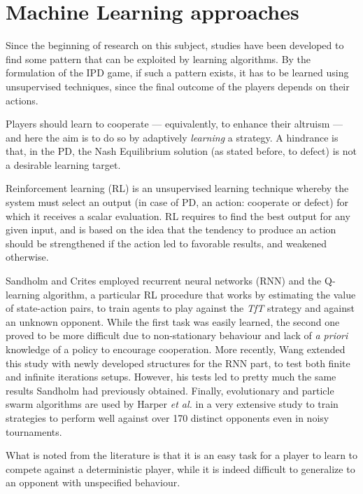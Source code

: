 \documentclass[journal,10pt,twoside]{IEEEtran}
\begin{document}
\section{Machine Learning approaches} \label{s:ml}
Since the beginning of research on this subject, studies have been developed to find some pattern that can be exploited by learning algorithms.
By the formulation of the IPD game, if such a pattern exists, it has to be learned using unsupervised techniques, since the final outcome of the players depends on their actions.

Players should learn to cooperate --- equivalently, to enhance their altruism --- and here the aim is to do so by adaptively \textit{learning} a strategy. A hindrance is that, in the PD, the Nash Equilibrium solution (as stated before, to defect) is not a desirable learning target.~\cite{coopSeqRL}

Reinforcement learning (RL) is an unsupervised learning technique whereby the system must select an output (in case of PD, an action: cooperate or defect) for which it receives a scalar evaluation. RL requires to find the best output for any given input, and is based on the idea that the tendency to produce an action should be strengthened if the action led to favorable results, and weakened otherwise.~\cite{sandholmRL}

Sandholm and Crites \cite{sandholmRL} employed recurrent neural networks (RNN) and the Q-learning algorithm, a particular RL procedure that works by estimating the value of state-action pairs, to train agents to play against the \textit{TfT} strategy and against an unknown opponent. While the first task was easily learned, the second one proved to be more difficult due to non-stationary behaviour and lack of \textit{a priori} knowledge of a policy to encourage cooperation.
More recently, Wang \cite{kedaoRL} extended this study with newly developed structures for the RNN part, to test both finite and infinite iterations setups. However, his tests led to pretty much the same results Sandholm had previously obtained.
Finally, evolutionary and particle swarm algorithms are used by Harper \textit{et al.} in a very extensive study \cite{plosRLdominant} to train strategies to perform well against over 170 distinct opponents even in noisy tournaments.

What is noted from the literature is that it is an easy task for a player to learn to compete against a deterministic player, while it is indeed difficult to generalize to an opponent with unspecified behaviour.
\end{document}
